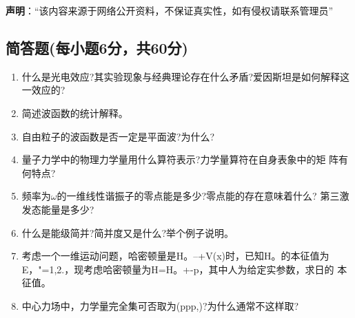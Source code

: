 
\textbf{声明}：“该内容来源于网络公开资料，不保证真实性，如有侵权请联系管理员”

\subsection{简答题(每小题6分，共60分)}
\begin{enumerate}
\item 什么是光电效应?其实验现象与经典理论存在什么矛盾?爱因斯坦是如何解释这一效应的?
\item 简述波函数的统计解释。
\item 自由粒子的波函数是否一定是平面波?为什么?
\item 量子力学中的物理力学量用什么算符表示?力学量算符在自身表象中的矩
阵有何特点?
\item 频率为$\omega$的一维线性谐振子的零点能是多少?零点能的存在意味着什么?
第三激发态能量是多少?
\item 什么是能级简并?简并度又是什么?举个例子说明。
\item 考虑一个一维运动问题，哈密顿量是H。--+V(x)时，已知H。的本征值为E，"=1,2.，现考虑哈密顿量为H=H。+-p，其中人为给定实参数，求日的
本征值。
\item 中心力场中，力学量完全集可否取为(ppp,)?为什么通常不这样取?
\end{enumerate}
